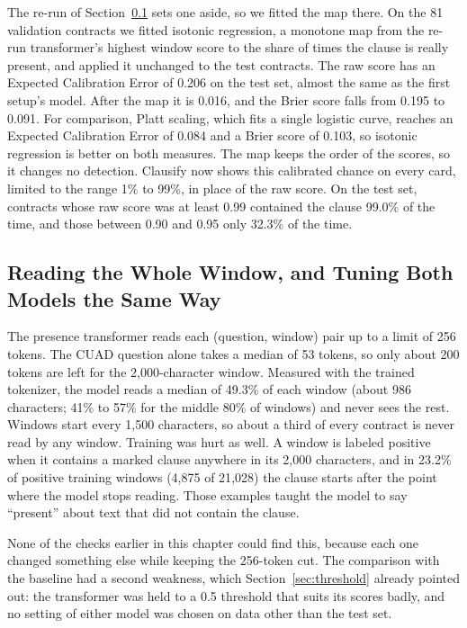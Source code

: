 The re-run of Section~\ref{sec:v2} sets one aside, so we fitted the map there. On the 81 validation contracts we fitted isotonic regression, a monotone map from the re-run transformer's highest window score to the share of times the clause is really present, and applied it unchanged to the test contracts. The raw score has an Expected Calibration Error of 0.206 on the test set, almost the same as the first setup's model. After the map it is 0.016, and the Brier score falls from 0.195 to 0.091. For comparison, Platt scaling, which fits a single logistic curve, reaches an Expected Calibration Error of 0.084 and a Brier score of 0.103, so isotonic regression is better on both measures. The map keeps the order of the scores, so it changes no detection. Clausify now shows this calibrated chance on every card, limited to the range 1\% to 99\%, in place of the raw score. On the test set, contracts whose raw score was at least 0.99 contained the clause 99.0\% of the time, and those between 0.90 and 0.95 only 32.3\% of the time.

\subsection{Reading the Whole Window, and Tuning Both Models the Same Way}
\label{sec:v2}
The presence transformer reads each (question, window) pair up to a limit of 256 tokens. The CUAD question alone takes a median of 53 tokens, so only about 200 tokens are left for the 2{,}000-character window. Measured with the trained tokenizer, the model reads a median of 49.3\% of each window (about 986 characters; 41\% to 57\% for the middle 80\% of windows) and never sees the rest. Windows start every 1{,}500 characters, so about a third of every contract is never read by any window. Training was hurt as well. A window is labeled positive when it contains a marked clause anywhere in its 2{,}000 characters, and in 23.2\% of positive training windows (4{,}875 of 21{,}028) the clause starts after the point where the model stops reading. Those examples taught the model to say ``present'' about text that did not contain the clause.

None of the checks earlier in this chapter could find this, because each one changed something else while keeping the 256-token cut. The comparison with the baseline had a second weakness, which Section~\ref{sec:threshold} already pointed out: the transformer was held to a 0.5 threshold that suits its scores badly, and no setting of either model was chosen on data other than the test set.


